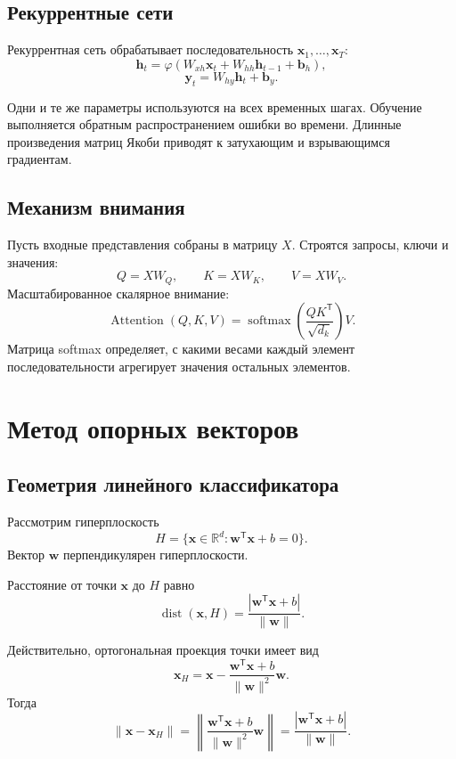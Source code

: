 \documentclass[12pt,a4paper]{article}
\theoremstyle{definition}
\newcommand{\R}{\mathbb{R}}
\newcommand{\T}{\mathsf{T}}
\newcommand{\1}{\mathbf{1}}
\DeclareMathOperator{\softmax}{softmax}
\DeclareMathOperator{\dist}{dist}
\begin{document}
\subsection{Рекуррентные сети}

Рекуррентная сеть обрабатывает последовательность
$\bm{x}_1,\ldots,\bm{x}_T$:
\[
    \bm{h}_t
    =
    \varphi(
        W_{xh}\bm{x}_t
        +
        W_{hh}\bm{h}_{t-1}
        +
        \bm{b}_h
    ),
\]
\[
    \bm{y}_t
    =
    W_{hy}\bm{h}_t+\bm{b}_y.
\]

Одни и те же параметры используются на всех временных шагах.
Обучение выполняется обратным распространением ошибки во времени.
Длинные произведения матриц Якоби приводят к затухающим и
взрывающимся градиентам.

\subsection{Механизм внимания}

Пусть входные представления собраны в матрицу $X$. Строятся запросы,
ключи и значения:
\[
    Q=XW_Q,
    \qquad
    K=XW_K,
    \qquad
    V=XW_V.
\]
Масштабированное скалярное внимание:
\[
    \operatorname{Attention}(Q,K,V)
    =
    \softmax\left(
        \frac{QK^{\T}}{\sqrt{d_k}}
    \right)V.
\]
Матрица softmax определяет, с какими весами каждый элемент
последовательности агрегирует значения остальных элементов.

\section{Метод опорных векторов}

\subsection{Геометрия линейного классификатора}

Рассмотрим гиперплоскость
\[
    H
    =
    \{\bm{x}\in\R^d:
    \bm{w}^{\T}\bm{x}+b=0\}.
\]
Вектор $\bm{w}$ перпендикулярен гиперплоскости.

Расстояние от точки $\bm{x}$ до $H$ равно
\[
    \dist(\bm{x},H)
    =
    \frac{|\bm{w}^{\T}\bm{x}+b|}
         {\|\bm{w}\|}.
\]

Действительно, ортогональная проекция точки имеет вид
\[
    \bm{x}_{H}
    =
    \bm{x}
    -
    \frac{\bm{w}^{\T}\bm{x}+b}{\|\bm{w}\|^2}\bm{w}.
\]
Тогда
\[
    \|\bm{x}-\bm{x}_{H}\|
    =
    \left\|
        \frac{\bm{w}^{\T}\bm{x}+b}{\|\bm{w}\|^2}\bm{w}
    \right\|
    =
    \frac{|\bm{w}^{\T}\bm{x}+b|}{\|\bm{w}\|}.
\]
\end{document}
